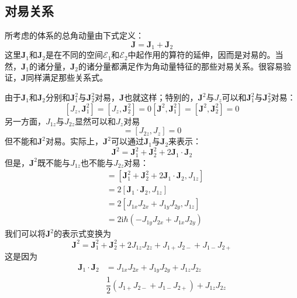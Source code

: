 \documentclass[]{article}
\begin{document}
\subsection{对易关系}
所考虑的体系的总角动量由下式定义：
\begin{equation}
	\boldsymbol{J}=\boldsymbol{J}_1+\boldsymbol{J}_2
\end{equation}
这里$\boldsymbol{J}_1$和$\boldsymbol{J}_2$是在不同的空间$\mathscr{E}_1$和$\mathscr{E}_2$中起作用的算符的延伸，因而是对易的。当然，$\boldsymbol{J}_1$的诸分量，$\boldsymbol{J}_2$的诸分量都满足作为角动量特征的那些对易关系。很容易验证，$\boldsymbol{J}$同样满足那些关系式。\par 
由于$\boldsymbol{J}_1$和$\boldsymbol{J}_2$分别和$\boldsymbol{J}_1^2$与$\boldsymbol{J}_2^2$对易，$\boldsymbol{J}$也就这样；特别的，$\boldsymbol{J}^2$与$J_z$可以和$\boldsymbol{J}_1^2$与$\boldsymbol{J}_2^2$对易：
\begin{subequations}
	\begin{equation}
		[J_z,\boldsymbol{J}_1^2]=[J_z,\boldsymbol{J}_2^2]=0
	\end{equation}
	\begin{equation}
		[\boldsymbol{J}^2,\boldsymbol{J}_1^2]=[\boldsymbol{J}^2,\boldsymbol{J}_2^2]=0
	\end{equation}
	\label{c13c13}
\end{subequations}
另一方面，$J_{1z}$与$J_{2z}$显然可以和$J_z$对易
\begin{equation}
	[J_{1z},J_{z}]=[J_{2z},J_{z}]=0
\end{equation}
但不能和$\boldsymbol{J}^2$对易。实际上，$\boldsymbol{J}^2$可以通过$\boldsymbol{J}_1$与$\boldsymbol{J}_2$来表示：
\begin{equation}
	\boldsymbol{J}^2=\boldsymbol{J}^2_1+\boldsymbol{J}^2_2+2\boldsymbol{J}_1\cdot\boldsymbol{J}_2
\end{equation}
但是，$\boldsymbol{J}^2$既不能与$J_{1z}$也不能与$J_{2z}$对易：
\begin{align}
	[\boldsymbol{J}^2,J_{1z}]&=[\boldsymbol{J}^2_1+\boldsymbol{J}_2^2+2\boldsymbol{J}_1\cdot\boldsymbol{J}_2,J_{1z}]\nonumber\\
	&=2[\boldsymbol{J}_1\cdot\boldsymbol{J}_2,J_{1z}]\nonumber\\
	&=2[J_{1x}J_{2x}+J_{1y}J_{2y},J_{1z}]\nonumber\\
	&=2\mathrm{i}\hbar(-J_{1y}J_{2x}+J_{1x}J_{2y})
\end{align}
我们可以将$\boldsymbol{J}^2$的表示式变换为
\begin{equation}
	\boldsymbol{J}^2=\boldsymbol{J}^2_1+\boldsymbol{J}_2^2+2J_{1z}J_{2z}+J_{1+}J_{2-}+J_{1-}J_{2+}
\end{equation}
这是因为
\begin{align}
	\boldsymbol{J}_1\cdot\boldsymbol{J}_2&=J_{1x}J_{2x}+J_{1y}J_{2y}+J_{1z}J_{2z}\nonumber\\
	&\dfrac{1}{2}(J_{1+}J_{2-}+J_{1-}J_{2+})+J_{1z}J_{2z}
\end{align}
\end{document}
